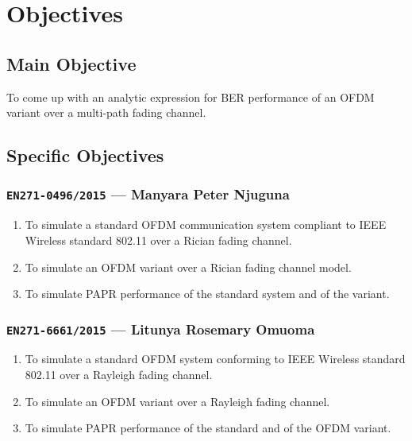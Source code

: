 \section{Objectives}
\subsection{Main Objective}
To come up with an analytic expression for \gls{BER} performance of an \gls{OFDM} variant over a multi-path fading channel.
\subsection{Specific Objectives}
\subsubsection{\texttt{EN271-0496/2015} --- Manyara Peter Njuguna}
\begin{enumerate}
	\item To simulate a standard \gls{OFDM} communication system compliant to IEEE Wireless standard 802.11 over a Rician fading channel.
	\item To simulate an OFDM variant over a Rician fading channel model.
	\item To simulate PAPR performance of the standard system and of the variant.
\end{enumerate}
\subsubsection{\texttt{EN271-6661/2015} --- Litunya Rosemary Omuoma}
\begin{enumerate}
	\item To simulate a standard OFDM system conforming to IEEE Wireless standard 802.11 over a Rayleigh fading channel.
	\item To simulate an OFDM variant over a Rayleigh fading channel.
	\item To simulate PAPR performance of the standard and of the OFDM variant.
\end{enumerate}
